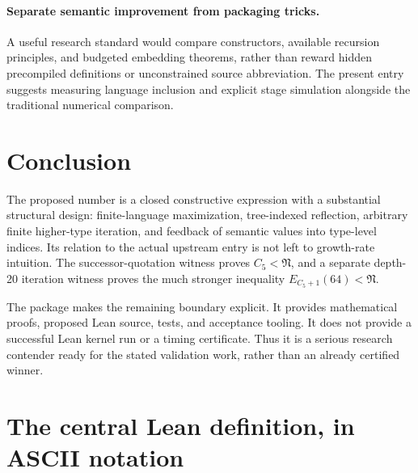 \documentclass[11pt]{article}
\theoremstyle{definition}
\newcommand{\Entry}{\mathfrak N}
\newcommand{\Cfive}{C_5}
\begin{document}
\paragraph{Separate semantic improvement from packaging tricks.}
A useful research standard would compare constructors, available recursion
principles, and budgeted embedding theorems, rather than reward hidden
precompiled definitions or unconstrained source abbreviation. The present
entry suggests measuring language inclusion and explicit stage simulation
alongside the traditional numerical comparison.

\section{Conclusion}

The proposed number is a closed constructive expression with a substantial
structural design: finite-language maximization, tree-indexed reflection,
arbitrary finite higher-type iteration, and feedback of semantic values
into type-level indices. Its relation to the actual upstream entry is not
left to growth-rate intuition. The successor-quotation witness proves
$\Cfive<\Entry$, and a separate depth-20 iteration witness proves the much
stronger inequality $E_{\Cfive+1}(64)<\Entry$.

The package makes the remaining boundary explicit. It provides mathematical
proofs, proposed Lean source, tests, and acceptance tooling. It does not
provide a successful Lean kernel run or a timing certificate. Thus it is a
serious research contender ready for the stated validation work, rather than
an already certified winner.

\appendix
\section{The central Lean definition, in ASCII notation}
\end{document}
